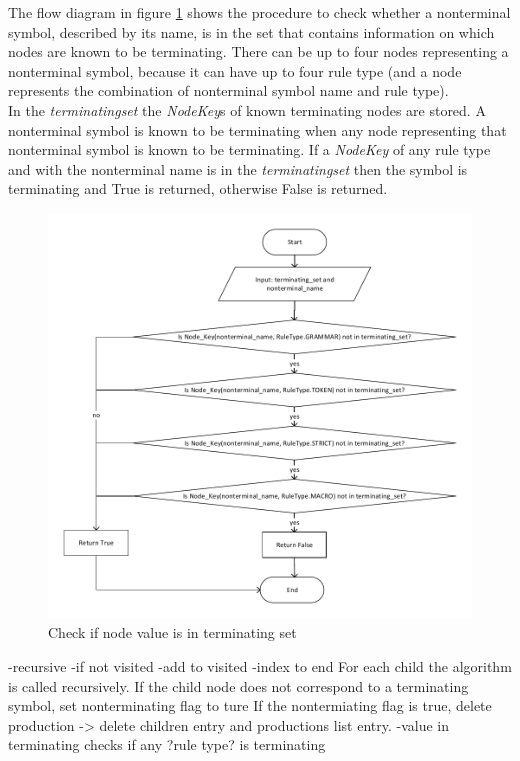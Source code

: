 The flow diagram in figure \ref{fig:ImplementationCheckIfValueInTerminating} shows the procedure to check whether a nonterminal symbol, described by its name, is in the set that contains information on which nodes are known to be terminating.
There can be up to four nodes representing a nonterminal symbol, because it can have up to four rule type (and a node represents the combination of nonterminal symbol name and rule type).\\
In the \textit{terminating\textunderscore set} the \textit{NodeKey}s of known terminating nodes are stored.
A nonterminal symbol is known to be terminating when any node representing that nonterminal symbol is known to be terminating.
If a \textit{NodeKey} of any rule type and  with the nonterminal name is in the \textit{terminating\textunderscore set} then the symbol is terminating and True is returned, otherwise False is returned.
\begin{figure}[H]
\centering
\includegraphics[width=.9\textwidth]{images/Implementation_value_in_terminating.pdf}
\caption{Check if node value is in terminating set}
\label{fig:ImplementationCheckIfValueInTerminating}
\end{figure}


-recursive
-if not visited
-add to visited
-index to end
For each child the algorithm is called recursively. If the child node does not correspond to a terminating symbol, set nonterminating flag to ture
If the nontermiating flag is true, delete production -> delete children entry and productions list entry.
-value in terminating checks if any ?rule type? is terminating

